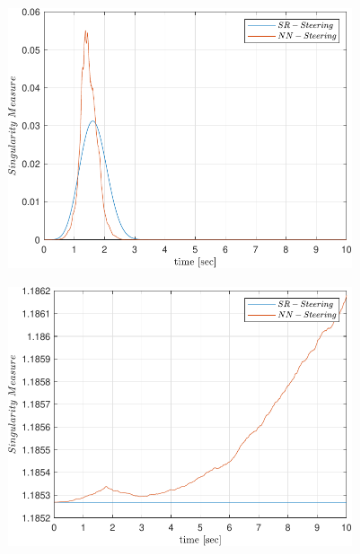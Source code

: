 \begin{figure}[ht]
     \centering
     \begin{subfigure}[b]{0.3\textwidth}
         \centering
         \includegraphics[width=\textwidth]{figures/plots/Results/vs-vs-CC.pdf}
        \caption{}
    \label{fig:nnvscmg_CC}
     \end{subfigure}
     \begin{subfigure}[b]{0.3\textwidth}
         \centering
         \includegraphics[width=\textwidth]{figures/plots/Results/vs-vs-DD.pdf}
          \caption{}
        \label{fig:nnvscmg_DD}
     \end{subfigure}
      \begin{subfigure}[b]{0.3\textwidth}

\end{subfigure}
\end{figure}
